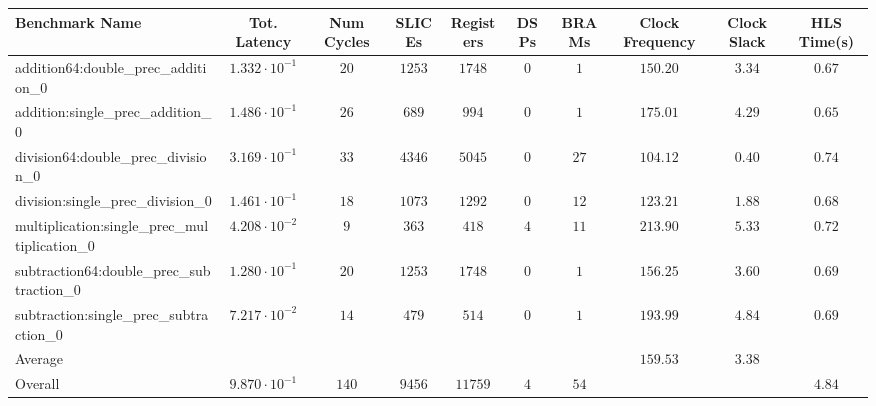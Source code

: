 \begin{tabular}{|l|c|c|c|c|c|c|c|c|c|}
\hline
Benchmark Name                                 & Tot. Latency            & Num Cycles & SLICEs   & Registers & DSPs  & BRAMs  & Clock Frequency & Clock Slack & HLS Time(s) \\
\hline
addition64:double\_prec\_addition\_0           & $ 1.332 \cdot 10^{-1} $ & $ 20     $ & $ 1253 $ & $ 1748  $ & $ 0 $ & $ 1  $ & $ 150.20      $ & $ 3.34    $ & $ 0.67    $ \\
addition:single\_prec\_addition\_0             & $ 1.486 \cdot 10^{-1} $ & $ 26     $ & $ 689  $ & $ 994   $ & $ 0 $ & $ 1  $ & $ 175.01      $ & $ 4.29    $ & $ 0.65    $ \\
division64:double\_prec\_division\_0           & $ 3.169 \cdot 10^{-1} $ & $ 33     $ & $ 4346 $ & $ 5045  $ & $ 0 $ & $ 27 $ & $ 104.12      $ & $ 0.40    $ & $ 0.74    $ \\
division:single\_prec\_division\_0             & $ 1.461 \cdot 10^{-1} $ & $ 18     $ & $ 1073 $ & $ 1292  $ & $ 0 $ & $ 12 $ & $ 123.21      $ & $ 1.88    $ & $ 0.68    $ \\
multiplication:single\_prec\_multiplication\_0 & $ 4.208 \cdot 10^{-2} $ & $ 9      $ & $ 363  $ & $ 418   $ & $ 4 $ & $ 11 $ & $ 213.90      $ & $ 5.33    $ & $ 0.72    $ \\
subtraction64:double\_prec\_subtraction\_0     & $ 1.280 \cdot 10^{-1} $ & $ 20     $ & $ 1253 $ & $ 1748  $ & $ 0 $ & $ 1  $ & $ 156.25      $ & $ 3.60    $ & $ 0.69    $ \\
subtraction:single\_prec\_subtraction\_0       & $ 7.217 \cdot 10^{-2} $ & $ 14     $ & $ 479  $ & $ 514   $ & $ 0 $ & $ 1  $ & $ 193.99      $ & $ 4.84    $ & $ 0.69    $ \\
\hline
Average                                        & $                     $ & $        $ & $      $ & $       $ & $   $ & $    $ & $ 159.53      $ & $ 3.38    $ & $         $ \\
\hline
Overall                                        & $ 9.870 \cdot 10^{-1} $ & $ 140    $ & $ 9456 $ & $ 11759 $ & $ 4 $ & $ 54 $ & $             $ & $         $ & $ 4.84    $ \\
\hline
\end{tabular}
